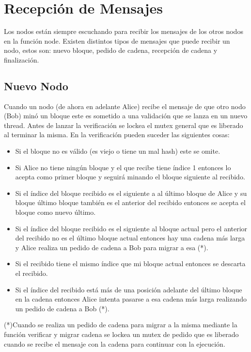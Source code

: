 \section{Recepción de Mensajes}

Los nodos están siempre escuchando para recibir los mensajes de los otros nodos en la función node. Existen distintos tipos de mensajes que puede recibir un nodo, estos son: nuevo bloque, pedido de cadena, recepción de cadena y finalización.

\subsection{Nuevo Nodo}
Cuando un nodo (de ahora en adelante Alice) recibe el mensaje de que otro nodo (Bob) minó un bloque este es sometido a una validación que se lanza en un nuevo thread. Antes de lanzar la verificación se lockea el mutex general que es liberado al terminar la misma. En la verificación pueden suceder las siguientes cosas:

\begin{itemize}
    \item Si el bloque no es válido (es viejo o tiene un mal hash) este se omite.
    \item Si Alice no tiene ningún bloque y el que recibe tiene índice 1 entonces lo acepta como primer bloque y seguirá minando el bloque siguiente al recibido.
    \item Si el índice del bloque recibido es el siguiente a al último bloque de Alice y su bloque último bloque también es el anterior del recibido entonces se acepta el bloque como nuevo último.
    \item Si el índice del bloque recibido es el siguiente al bloque actual pero el anterior del recibido no es el último bloque actual entonces hay una cadena más larga y Alice realiza un pedido de cadena a Bob para migrar a esa (*).
    \item Si el recibido tiene el mismo índice que mi bloque actual entonces se descarta el recibido.
    \item Si el índice del recibido está más de una posición adelante del último bloque en la cadena entonces Alice intenta pasarse a esa cadena más larga realizando un pedido de cadena a Bob (*).
\end{itemize}

(*)Cuando se realiza un pedido de cadena para migrar a la misma mediante la función verificar y migrar cadena se lockea un mutex de pedido que es liberado cuando se recibe el mensaje con la cadena para continuar con la ejecución.


